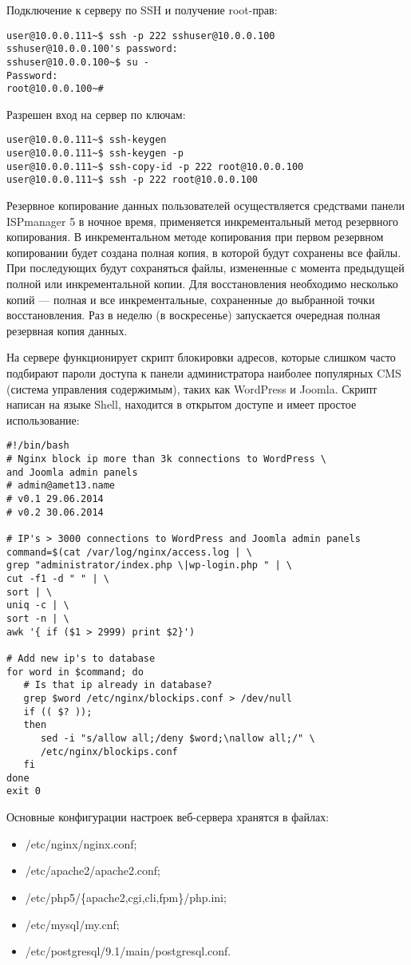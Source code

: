 Подключение к серверу по SSH и получение root-прав:
\begin{lstlisting}
user@10.0.0.111~$ ssh -p 222 sshuser@10.0.0.100
sshuser@10.0.0.100's password:
sshuser@10.0.0.100~$ su -
Password:
root@10.0.0.100~#
\end{lstlisting}

Разрешен вход на сервер по ключам:
\begin{lstlisting}
user@10.0.0.111~$ ssh-keygen
user@10.0.0.111~$ ssh-keygen -p
user@10.0.0.111~$ ssh-copy-id -p 222 root@10.0.0.100
user@10.0.0.111~$ ssh -p 222 root@10.0.0.100
\end{lstlisting}

Резервное копирование данных пользователей осуществляется средствами панели ISPmanager 5 в ночное время, применяется инкрементальный метод резервного копирования.
В инкрементальном методе копирования при первом резервном копировании будет создана полная копия, в которой будут сохранены все файлы.
При последующих будут сохраняться файлы, измененные с момента предыдущей полной или инкрементальной копии.
Для восстановления необходимо несколько копий --- полная и все инкрементальные, сохраненные до выбранной точки восстановления.
Раз в неделю (в воскресенье) запускается очередная полная резервная копия данных.

На сервере функционирует скрипт блокировки адресов, которые слишком часто подбирают пароли доступа к панели администратора наиболее популярных CMS (система управления содержимым), таких как WordPress и Joomla.
Скрипт написан на языке Shell, находится в открытом доступе и имеет простое использование:
\begin{lstlisting}
#!/bin/bash
# Nginx block ip more than 3k connections to WordPress \
and Joomla admin panels
# admin@amet13.name
# v0.1 29.06.2014
# v0.2 30.06.2014

# IP's > 3000 connections to WordPress and Joomla admin panels
command=$(cat /var/log/nginx/access.log | \
grep "administrator/index.php \|wp-login.php " | \
cut -f1 -d " " | \
sort | \
uniq -c | \
sort -n | \
awk '{ if ($1 > 2999) print $2}')

# Add new ip's to database
for word in $command; do
   # Is that ip already in database?
   grep $word /etc/nginx/blockips.conf > /dev/null
   if (( $? ));
   then 
      sed -i "s/allow all;/deny $word;\nallow all;/" \
      /etc/nginx/blockips.conf
   fi
done
exit 0
\end{lstlisting}

Основные конфигурации настроек веб-сервера хранятся в файлах:
\begin{itemize}
  \item /etc/nginx/nginx.conf;
  \item /etc/apache2/apache2.conf;
  \item /etc/php5/\{apache2,cgi,cli,fpm\}/php.ini;
  \item /etc/mysql/my.cnf;
  \item /etc/postgresql/9.1/main/postgresql.conf.
\end{itemize}

